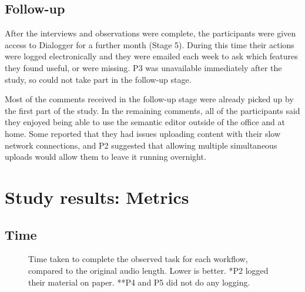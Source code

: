 
\subsection{Follow-up}\label{sec:followup}
After the interviews and observations were complete, the participants were given access to Dialogger for a further
month (Stage 5). During this time their actions were logged electronically and they were emailed each week to ask which
features they found useful, or were missing. P3 was unavailable immediately after the study, so could not take part in
the follow-up stage.

Most of the comments received in the follow-up stage were already picked up by the first part of the study. In the
remaining comments, all of the participants said they enjoyed being able to use the semantic editor outside of the
office and at home. Some reported that they had issues uploading content with their slow network connections, and P2
suggested that allowing multiple simultaneous uploads would allow them to leave it running overnight.


\section{Study results: Metrics}\label{sec:resultsmetrics}
\subsection{Time}

\begin{figure}
\centering
	\caption{Time taken to complete the observed task for each workflow, compared
    to the original audio length. Lower is better. *P2 logged their material on
    paper. **P4 and P5 did not do any logging.}
  \label{fig:time}
\end{figure}

